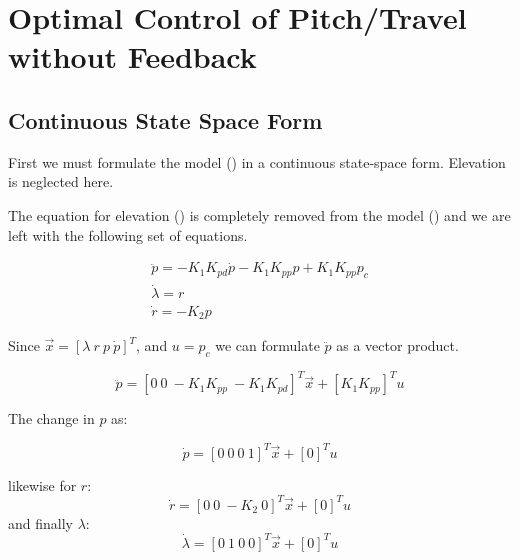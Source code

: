 \newcommand{\texMacro}[2]{\texttt{\textbackslash{#1}\{#2\}}}
\section{Optimal Control of Pitch/Travel without Feedback}

\subsection{Continuous State Space Form}
First we must formulate the model () in a continuous state-space form. Elevation is neglected here.

The equation for elevation () is completely removed from the model () and we are left with the following set of equations.

\begin{subequations}
	\begin{align}
		\ddot{p} = - K_1K_{pd}\dot{p} - K_1K_{pp}p + K_1K_{pp}p_c \\
		\dot{\lambda} = r \\
		\dot{r} = -K_2p
	\end{align}
\end{subequations}

Since $ \vec{x} = [\lambda\ r\ p\ \dot{p}]^T $, and $ u = p_c $ we can formulate $\ddot{p}$ as a vector product.

\begin{equation}
	\ddot{p} = [0\ 0\ -K_1K_{pp}\ -K_1K_{pd}]^T \vec{x} + [K_1K_{pp}]^T u
\end{equation}

The change in $ p $ as:

\begin{equation}
\dot{p} = [0\ 0\ 0\ 1]^T \vec{x} + [0]^T u
\end{equation}

likewise for $ r $:
\begin{equation}
	\dot{r} = [0\ 0\ -K_2\ 0]^T \vec{x} + [0]^T u
\end{equation}
and finally $\lambda$:
\begin{equation}
	\dot{\lambda} = [0\ 1\ 0\ 0]^T \vec{x} + [0]^T u
\end{equation}

